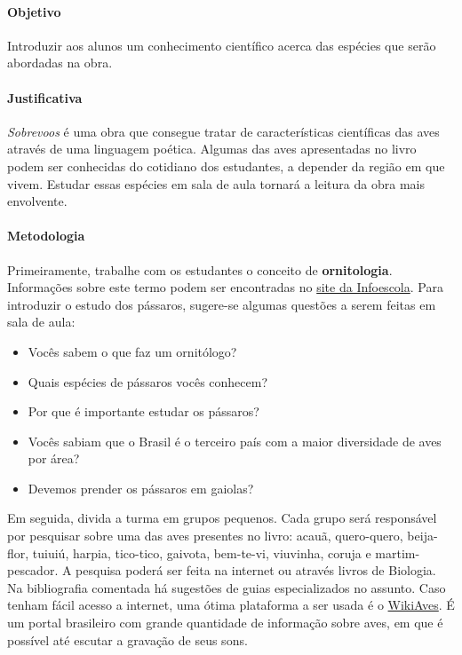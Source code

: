 \documentclass[11pt]{extarticle}
\begin{document}
\paragraph{Objetivo} Introduzir aos alunos um conhecimento científico acerca das espécies que serão abordadas na obra.

\paragraph{Justificativa} \textit{Sobrevoos} é uma obra que consegue tratar de características científicas das aves através de uma linguagem poética. Algumas das aves apresentadas no livro podem ser conhecidas do cotidiano dos estudantes, a depender da região em que vivem. Estudar essas espécies em sala de aula tornará a leitura da obra mais envolvente.

\paragraph{Metodologia} Primeiramente, trabalhe com os estudantes o conceito de \textbf{ornitologia}. Informações sobre este termo podem ser encontradas no \href{https://www.infoescola.com/biologia/ornitologia/}{site da Infoescola}. Para introduzir o estudo dos pássaros, sugere-se algumas questões a serem feitas em sala de aula: 

\begin{itemize}

\item Vocês sabem o que faz um ornitólogo?

\item Quais espécies de pássaros vocês conhecem?

\item Por que é importante estudar os pássaros?

\item Vocês sabiam que o Brasil é o terceiro país com a maior diversidade de aves por área?

\item Devemos prender os pássaros em gaiolas?

\end{itemize}

Em seguida, divida a turma em grupos pequenos. Cada grupo será responsável por pesquisar sobre uma das aves presentes no livro: acauã, quero-quero, beija-flor, tuiuiú, harpia, tico-tico, gaivota, bem-te-vi, viuvinha, coruja e martim-pescador. A pesquisa poderá ser feita na internet ou através livros de Biologia. Na bibliografia comentada há sugestões de guias especializados no assunto. Caso tenham fácil acesso a internet, uma ótima plataforma a ser usada é o \href{https://www.wikiaves.com.br/}{WikiAves}. É um portal brasileiro com grande quantidade de informação sobre aves, em que é possível até escutar a gravação de seus sons.
\end{document}
